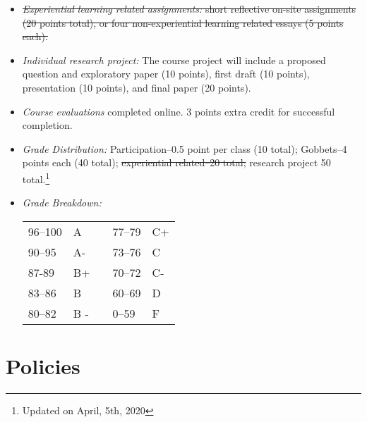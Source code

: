 \documentclass[article,oneside]{memoir}
\begin{document}
\begin{itemize}
\item \sout{\textit{Experiential learning related assignments:} short reflective on-site assignments (20 points total), or four non-experiential learning related essays (5 points each).}

\item \textit{Individual research project:} The course project will include a proposed question and exploratory paper (10 points), first draft (10 points), presentation (10 points), and final paper (20 points). 

\item \textit{Course evaluations} completed online. 3 points extra credit for successful completion.

\item \textit{Grade Distribution:} Participation--0.5 point per class (10 total); Gobbets--4 points each (40 total); \sout{experiential related--20 total;} research project 50 total.\footnote{Updated on April, 5th, 2020}

\item \textit{Grade Breakdown:}

 \begin{tabular}{ | l | l | p{2cm} | l | l | }
    \hline 
96--100 & A  & &  77--79 &  C+ \\  
90--95 & A- & &  73--76 & C \\
87-89 & B+ &  &  70--72 & C- \\ 
83--86 & B  & &  60--69 & D\\
80--82 & B - & & 0--59 & F\\ \hline
    \end{tabular}


\end{itemize}





\section{Policies}
\end{document}
